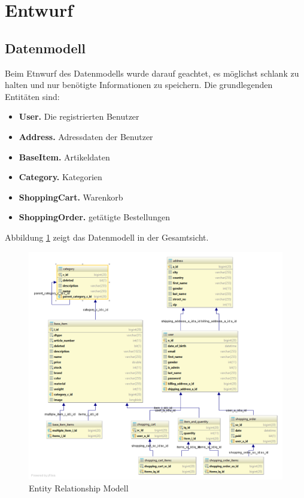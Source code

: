 \section{Entwurf}\label{outline} \thispagestyle{nomarkstyle}

\subsection{Datenmodell}\label{outline_datamodel}
Beim Etnwurf des Datenmodells wurde darauf geachtet, es möglichst schlank zu halten und nur benötigte Informationen zu speichern.
Die grundlegenden Entitäten sind:
\begin{itemize}
\item\textbf{User.} Die registrierten Benutzer
\item\textbf{Address.} Adressdaten der Benutzer
\item\textbf{BaseItem.} Artikeldaten
\item\textbf{Category.} Kategorien
\item\textbf{ShoppingCart.} Warenkorb
\item\textbf{ShoppingOrder.} getätigte Bestellungen
\end{itemize}


Abbildung \ref{fig:ERM} zeigt das Datenmodell in der Gesamtsicht.
\begin{figure}[th!]
	\centering
	\includegraphics[width=\linewidth]{bilder/kap6/erm_diagram.png}
	\caption{Entity Relationship Modell}
	\label{fig:ERM}
\end{figure}


